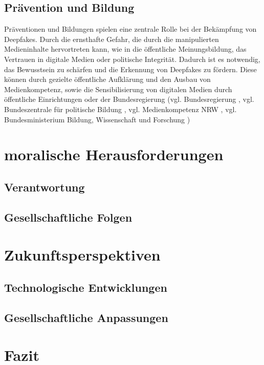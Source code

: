 \documentclass[a4paper,12pt]{article}
\begin{document}
\subsection{Prävention und Bildung}
Präventionen und Bildungen spielen eine zentrale Rolle bei der Bekämpfung von Deepfakes.
Durch die ernsthafte Gefahr, die durch die manipulierten Medieninhalte hervortreten kann,
wie in die öffentliche Meinungsbildung, das Vertrauen in digitale Medien oder politische Integrität.
Dadurch ist es notwendig, das Bewusstsein zu schärfen und die Erkennung von Deepfakes zu fördern.
Diese können durch gezielte öffentliche Aufklärung und den Ausbau von Medienkompetenz,
sowie die Sensibilisierung von digitalen Medien durch öffentliche Einrichtungen oder der Bundesregierung 
(vgl. Bundesregierung \cite{Bundesregierung2024}, vgl. Bundeszentrale für politische Bildung \cite{BPB2024}, vgl. Medienkompetenz NRW \cite{Medienkompetenz2024},
vgl. Bundesministerium Bildung, Wissenschaft und Forschung \cite{Erwachsenenbildung2024})

\newpage

\section{moralische Herausforderungen}
\subsection{Verantwortung}
\subsection{Gesellschaftliche Folgen}

\newpage

\section{Zukunftsperspektiven}
\subsection{Technologische Entwicklungen}
\subsection{Gesellschaftliche Anpassungen}
\newpage

\section{Fazit}
\end{document}
